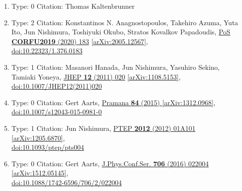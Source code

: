 \documentclass[a4paper,10pt]{article}
\begin{document}
\begin{enumerate}
\begin{enumerate}
  \item Type: 0 Citation: Thomas Kaltenbrunner
  \item Type: 2 Citation: Konstantinos N. Anagnostopoulos, Takehiro Azuma, Yuta Ito, Jun Nishimura, Toshiyuki Okubo, Stratos Kovalkov Papadoudis, \href{https://www.doi.org/10.22323/1.376.0183}{PoS {\bf CORFU2019} (2020) 183}  \href{https://arxiv.org/abs/2005.12567}{[arXiv:2005.12567]},\\\href{https://www.doi.org/10.22323/1.376.0183}{doi:10.22323/1.376.0183}
  \item Type: 1 Citation: Masanori Hanada, Jun Nishimura, Yasuhiro Sekino, Tamiaki Yoneya, \href{https://www.doi.org/10.1007/JHEP12(2011)020}{JHEP {\bf 12} (2011) 020}  \href{https://arxiv.org/abs/1108.5153}{[arXiv:1108.5153]},\\\href{https://www.doi.org/10.1007/JHEP12(2011)020}{doi:10.1007/JHEP12(2011)020}
  \item Type: 0 Citation: Gert Aarts, \href{https://www.doi.org/10.1007/s12043-015-0981-0}{Pramana {\bf 84} (2015) }  \href{https://arxiv.org/abs/1312.0968}{[arXiv:1312.0968]},\\\href{https://www.doi.org/10.1007/s12043-015-0981-0}{doi:10.1007/s12043-015-0981-0}
  \item Type: 1 Citation: Jun Nishimura, \href{https://www.doi.org/10.1093/ptep/pts004}{PTEP {\bf 2012} (2012) 01A101}  \href{https://arxiv.org/abs/1205.6870}{[arXiv:1205.6870]},\\\href{https://www.doi.org/10.1093/ptep/pts004}{doi:10.1093/ptep/pts004}
  \item Type: 0 Citation: Gert Aarts, \href{https://www.doi.org/10.1088/1742-6596/706/2/022004}{J.Phys.Conf.Ser. {\bf 706} (2016) 022004}  \href{https://arxiv.org/abs/1512.05145}{[arXiv:1512.05145]},\\\href{https://www.doi.org/10.1088/1742-6596/706/2/022004}{doi:10.1088/1742-6596/706/2/022004}

\end{enumerate}
\end{enumerate}
\end{document}
